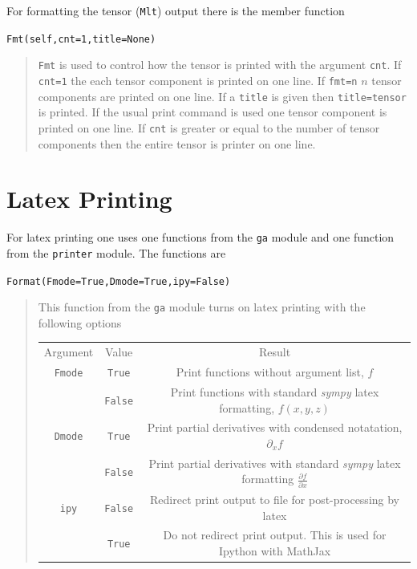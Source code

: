 \documentclass[12pt]{report}
\newcommand{\lp}{\left (}
\newcommand{\rp}{\right )}
\newcommand{\f}[2]{{#1}\lp {#2} \rp}
\newcommand{\T}[1]{\texttt{#1}}
\begin{document}
For formatting the tensor (\T{Mlt}) output there is the member function

\T{Fmt(self,cnt=1,title=None)}
\begin{quote}
\T{Fmt} is used to control how the tensor is printed with the argument
\T{cnt}.  If \T{cnt=1} the each tensor component is printed on one line.  If
\T{fmt=n} $n$ tensor components are printed on one line.  If a
\T{title} is given then \T{title=tensor} is printed.  If the usual print
command is used one tensor component is printed on one line. If \T{cnt} is
greater or equal to the number of tensor components then the entire tensor
is printer on one line.
\end{quote}

\section{Latex Printing}\label{LatexPrinting}

For latex printing one uses one functions from the \T{ga} module and one
function from the \T{printer} module.  The
functions are

\T{Format(Fmode=True,Dmode=True,ipy=False)}
\begin{quote}
   This function from the \T{ga} module turns on latex printing with the
   following options

\begin{longtable}{ccc}
         Argument &  Value &  Result \\
         \T{Fmode} &  \T{True} &  Print functions without argument list, $f$ \\
               &  \T{False} &  Print functions with standard \emph{sympy} latex formatting, $\f{f}{x,y,z}$ \\
         \T{Dmode} &  \T{True} &  Print partial derivatives with condensed notatation, $\partial_{x}f$ \\
               &  \T{False} &  Print partial derivatives with standard \emph{sympy} latex formatting $\frac{\partial f}{\partial x}$ \\
         \T{ipy}   &  \T{False} &  Redirect print output to file for post-processing by latex \\
               &  \T{True} &  Do not redirect print output.  This is used for Ipython with MathJax
\end{longtable}
\end{quote}
\end{document}
